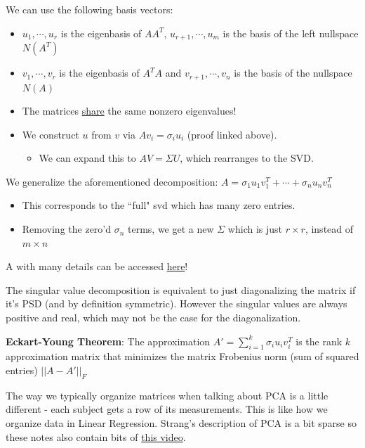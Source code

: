 \documentclass[12pt]{article} %
\begin{document}
We can use the following basis vectors:
\begin{itemize}[topsep=-1pt,itemsep=-1pt]
    \item $u_1,\cdots,u_r$ is the eigenbasis of $AA^T$, $u_{r+1},\cdots, u_m$ is the basis of the left nullspace $N(A^T)$
    \item $v_1,\cdots, v_r$ is the eigenbasis of $A^TA$ and $v_{r+1},\cdots, v_n$ is the basis of the nullspace $N(A)$
    \item The matrices \href{https://math.stackexchange.com/questions/1087064/non-zero-eigenvalues-of-aat-and-ata}{share} the same nonzero eigenvalues!
    \item We construct $u$ from $v$ via $Av_i = \sigma_i u_i$ (proof linked above).
    \begin{itemize}[topsep=-1pt,itemsep=-1pt]
        \item We can expand this to $AV = \Sigma U$, which rearranges to the SVD.
    \end{itemize}
\end{itemize}

We generalize the aforementioned decomposition: $A = \sigma_1 u_1 v_1^T + \cdots + \sigma_n u_n v_n^T$
\begin{itemize}[topsep=-1pt,itemsep=-1pt]
    \item This corresponds to the ``full" svd which has many zero entries.
    \item Removing the zero'd $\sigma_n$ terms, we get a new $\Sigma$ which is just $r \times r$, instead of $m \times n$
\end{itemize}

A  with many details can be accessed \href{https://gregorygundersen.com/blog/2018/12/20/svd-proof/#4-textbfu_i-is-a-unit-eigenvector-of-aatop}{here}!

The singular value decomposition is equivalent to just diagonalizing the matrix if it's PSD (and by definition symmetric). However the singular values are always positive and real, which may not be the case for the diagonalization.


\textbf{Eckart-Young Theorem}:
The approximation $A' = \sum_{i=1}^k \sigma_i u_i v_i^T$ is the rank $k$ approximation matrix that minimizes the matrix Frobenius norm (sum of squared entries) $||A - A'||_F$



\newpage

The way we typically organize matrices when talking about PCA is a little different - each subject gets a row of its measurements. This is like how we organize data in Linear Regression. Strang's description of PCA is a bit sparse so these notes also contain bits of \href{https://www.youtube.com/watch?v=fkf4IBRSeEc&list=PLMrJAkhIeNNRpsRhXTMt8uJdIGz9-X_1-&index=23}{this video}.
\end{document}
